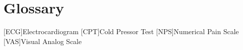 \chapter{Glossary}

\footnotesize
\SingleSpacing

\begin{multicols}{2}
\begin{acronym}[AAAAAA]

	[ECG]{Electrocardiogram}
	[CPT]{Cold Pressor Test}
	[NPS]{Numerical Pain Scale}
	[VAS]{Visual Analog Scale}

\end{acronym}
\end{multicols}

